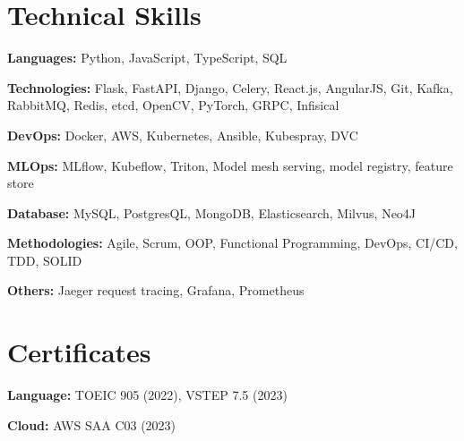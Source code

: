 \documentclass[letterpaper,11pt]{article}
\begin{document}
\section{Technical Skills}
 \begin{itemize}[leftmargin=0.15in, label={}]
    \small{\item{
     \textbf{Languages:}{ Python, JavaScript, TypeScript, SQL} \\ \vspace{3pt}

        \textbf{Technologies:}{ Flask, FastAPI, Django, Celery, React.js, AngularJS, Git, Kafka, RabbitMQ, Redis, etcd, OpenCV, PyTorch, GRPC, Infisical} \\ \vspace{3pt}

        \textbf{DevOps:}{ Docker, AWS, Kubernetes, Ansible, Kubespray, DVC} \\ \vspace{3pt}

        \textbf{MLOps:}{ MLflow, Kubeflow, Triton, Model mesh serving, model registry, feature store} \\  \vspace{3pt}

        \textbf{Database:}{  MySQL, PostgresQL, MongoDB, Elasticsearch, Milvus, Neo4J} \\ \vspace{3pt}

        \textbf{Methodologies:}{ Agile, Scrum, OOP, Functional Programming, DevOps, CI/CD, TDD, SOLID} \\ \vspace{3pt}

	\textbf{Others: }{Jaeger request tracing, Grafana, Prometheus} \\ \vspace{3pt}
    }}
 \end{itemize}

\section{Certificates}
 \begin{itemize}[leftmargin=0.15in, label={}]
    \small{\item{
     \textbf{Language:}{ TOEIC 905 (2022), VSTEP 7.5 (2023)} \\ \vspace{3pt}

        \textbf{Cloud:}{ AWS SAA C03 (2023)} \\ \vspace{3pt}

    }}
 \end{itemize}



\end{document}
